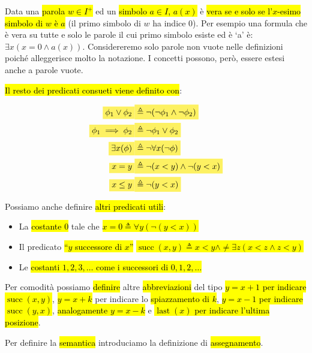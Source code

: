 \documentclass[a4paper,11pt,oneside]{article}
\theoremstyle{plain}
\theoremstyle{definition}
\theoremstyle{remark}
\newcommand{\mhl}[1]{\colorbox{hlcolor}{$\displaystyle #1$}}
\DeclareMathOperator{\succc}{succ}
\DeclareMathOperator{\last}{last}
\begin{document}
Data una \hl{parola $w \in I^+$} ed un \hl{simbolo $a\in I$, $a(x)$} è \hl{vera
se e solo se l'$x$-esimo simbolo di $w$ è $a$} (il primo simbolo di $w$ ha
indice 0). Per esempio una formula che è vera su tutte e solo le parole il cui
primo simbolo esiste ed è `a' è: $\exists x(x = 0 \land a(x))$. Considereremo
solo parole non vuote nelle definizioni poiché alleggerisce molto la notazione.
I concetti possono, però, essere estesi anche a parole vuote.

\hl{Il resto dei predicati consueti viene definito con}:

\begin{align}
  \mhl{\phi_1 \lor \phi_2}     & \mhl{\triangleq \neg(\neg\phi_1\land\neg\phi_2)} \\
  \mhl{\phi_1 \implies \phi_2} & \mhl{\triangleq \neg\phi_1\lor\phi_2} \\
  \mhl{\exists x(\phi)}        & \mhl{\triangleq \neg \forall x(\neg\phi)} \\
  \mhl{x = y}                  & \mhl{\triangleq \neg(x<y) \land \neg(y<x)} \\
  \mhl{x \leq y}               & \mhl{\triangleq \neg(y<x)}
\end{align}

Possiamo anche definire \hl{altri predicati utili}:

\begin{itemize}
  \item La \hl{costante $0$} tale che \hl{$x = 0 \triangleq \forall y(\neg(y<x))$}
  \item Il predicato \hl{``$y$ successore di  $x$''}
    \hl{$\succc(x,y) \triangleq x<y \land \neq\exists z(x<z \land z<y)$}
  \item Le \hl{costanti $1,2,3,\ldots$ come i successori di $0,1,2,\ldots$}
\end{itemize}

Per comodità possiamo \hl{definire} altre \hl{abbreviazioni} del tipo
\hl{$y=x+1$ per indicare $\succc(x,y)$}, \hl{$y=x+k$} per indicare lo
\hl{spiazzamento di $k$}, \hl{$y=x-1$ per indicare $\succc(y,x)$},
\hl{analogamente $y=x-k$} e \hl{$\last(x)$ per indicare l'ultima posizione}.

Per definire la \hl{semantica} introduciamo la definizione di \hl{assegnamento}.
\end{document}

